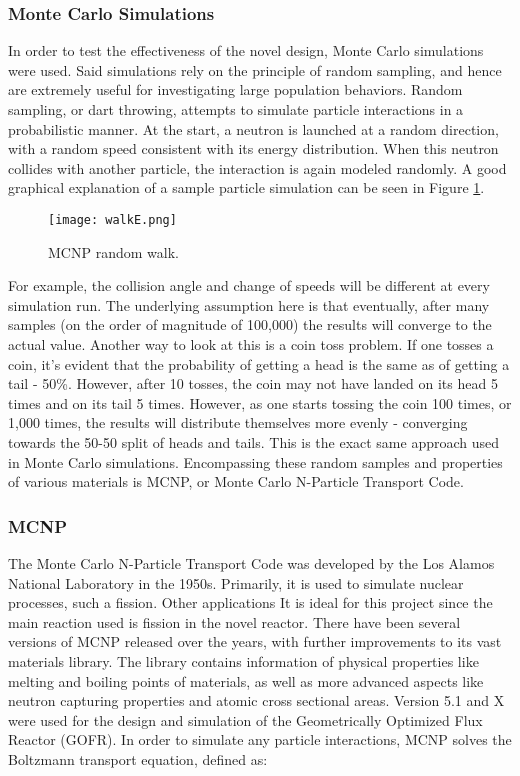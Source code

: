 \subsubsection{Monte Carlo Simulations}

In order to test the effectiveness of the novel design, Monte Carlo simulations were used. Said simulations rely on the principle of random sampling, and hence are extremely useful for investigating large population behaviors. Random sampling, or dart throwing, attempts to simulate particle interactions in a probabilistic manner. At the start, a neutron is launched at a random direction, with a random speed consistent with its energy distribution. When this neutron collides with another particle, the interaction is again modeled randomly. A good graphical explanation of a sample particle simulation can be seen in Figure \ref{fig:randomwalk}.

\begin{figure}[!htbp]
\centering
\texttt{[image: walkE.png]}
\caption{MCNP random walk.}
\label{fig:randomwalk}
\end{figure}

For example, the collision angle and change of speeds will be different at every simulation run. The underlying assumption here is that eventually, after many samples (on the order of magnitude of 100,000) the results will converge to the actual value. Another way to look at this is a coin toss problem. If one tosses a coin, it's evident that the probability of getting a head is the same as of getting a tail - 50\%. However, after 10 tosses, the coin may not have landed on its head 5 times and on its tail 5 times. However, as one starts tossing the coin 100 times, or 1,000 times, the results will distribute themselves more evenly - converging towards the 50-50 split of heads and tails. This is the exact same approach used in Monte Carlo simulations. Encompassing these random samples and properties of various materials is MCNP, or Monte Carlo N-Particle Transport Code.

\subsubsection{MCNP}

The Monte Carlo N-Particle Transport Code was developed by the Los Alamos National Laboratory in the 1950s. Primarily, it is used to simulate nuclear processes, such a fission. Other applications It is ideal for this project since the main reaction used is fission in the novel reactor. There have been several versions of MCNP released over the years, with further improvements to its vast materials library. The library contains information of physical properties like melting and boiling points of materials, as well as more advanced aspects like neutron capturing properties and atomic cross sectional areas. Version 5.1 and X were used for the design and simulation of the Geometrically Optimized Flux Reactor (GOFR). In order to simulate any particle interactions, MCNP solves the Boltzmann transport equation, defined as:

